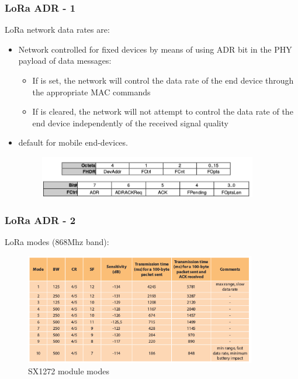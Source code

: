 \begin{frame}[fragile]
  \frametitle{LoRa ADR - 1}
  LoRa network data rates are:
 \begin{itemize}
  \item Network controlled for fixed devices by means of using ADR bit in the PHY payload of data messages:
  \begin{itemize}
    \item If is set, the network will control the data rate of the end device through the appropriate MAC commands
    \item If is cleared, the network will not attempt to control the data rate of the end device independently of the received signal quality
  \end{itemize}
  \item default for mobile end-devices.
\begin{figure}
  \centering
  \includegraphics[width=0.9\textwidth]{img/PHYpayload.png}
  \end{figure}
 \end{itemize}
\end{frame}

\begin{frame}[fragile]
  \frametitle{LoRa ADR - 2}
  LoRa modes (868Mhz band):
\begin{figure}
  \centering
  \includegraphics[width=0.9\textwidth]{img/LoRamode.png}
  \caption{SX1272 module modes}
 \end{figure}
\end{frame}

